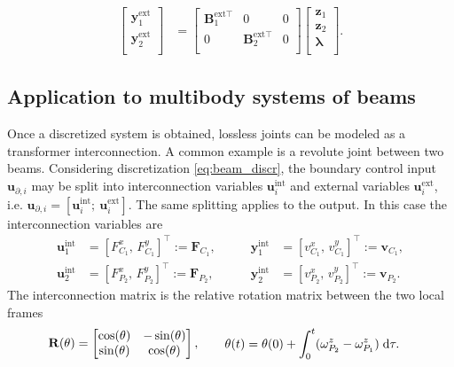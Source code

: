 \documentclass{svjour3}                     %
\begin{document}
\begin{align*}
\begin{bmatrix}
\mathbf{y}_1^{\text{ext}} \\ \mathbf{y}_2^{\text{ext}} \\
\end{bmatrix}  &= \begin{bmatrix}
\mathbf{B}_1^{\text{ext} \top} & 0 & 0 \\
0 & \mathbf{B}_2^{\text{ext} \top} & 0 \\
\end{bmatrix} \begin{bmatrix}
\mathbf{z}_1 \\ 
\mathbf{z}_2 \\
\bm{\lambda} \\
\end{bmatrix}.
\end{align*}



\subsection{Application to multibody systems of beams}
\label{sec:int_beams}
Once a discretized system is obtained, lossless joints can be modeled as a transformer interconnection. A common example is a revolute joint between two beams. Considering discretization \eqref{eq:beam_discr}, the boundary control input $\mathbf{u}_{\partial, i}$ may be split into interconnection variables $\mathbf{u}_i^{\text{int}}$ and external variables  $\mathbf{u}_i^{\text{ext}}$, i.e. $\mathbf{u}_{\partial, i} = [\mathbf{u}_i^{\text{int}}; \ \mathbf{u}_i^{\text{ext}}]$. The same splitting applies to the output. In this case the interconnection variables are
\begin{equation*}
\begin{aligned}
\mathbf{u}_1^{\text{int}} &= [F^x_{C_1}, \, F^y_{C_1}]^\top := \mathbf{F}_{C_1}, \\
\mathbf{u}_2^{\text{int}} &= [F^x_{P_2}, \, F^y_{P_2}]^\top := \mathbf{F}_{P_2},
\end{aligned} \qquad
\begin{aligned}
\mathbf{y}_1^{\text{int}} &= [v^x_{C_1}, \, v^y_{C_1}]^\top := \mathbf{v}_{C_1}, \\
\mathbf{y}_2^{\text{int}} &= [v^x_{P_2}, \, v^y_{P_2}]^\top := \mathbf{v}_{P_2}.
\end{aligned}
\end{equation*}
The interconnection matrix is the relative rotation matrix between the two local frames
\begin{equation}
\mathbf{R}(\theta) = \begin{bmatrix}
\cos(\theta) & - \sin(\theta) \\
\sin(\theta) & \cos(\theta) \\
\end{bmatrix}, \qquad 
\begin{aligned}
\theta(t) &= \theta(0) + \int_{0}^t (\omega^z_{P_2} - \omega^z_{P_1}) \d{\tau}.
\end{aligned}
\end{equation}
\end{document}
